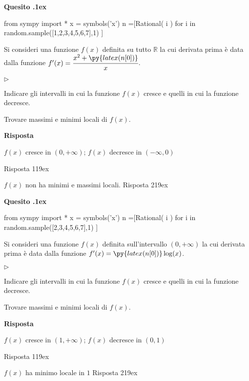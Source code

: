 \documentclass[11pt,twoside,a4paper]{article}
\newcommand{\mylabel}[1]{#1\hfill}
\renewenvironment{itemize}
  {\begin{list}{$\triangleright$}{%
   \setlength{\parskip}{0mm}
   \setlength{\topsep}{.4\baselineskip}
   \setlength{\rightmargin}{0mm}
   \setlength{\listparindent}{0mm}
   \setlength{\itemindent}{0mm}
   \setlength{\labelwidth}{2ex}
   \setlength{\itemsep}{.4\baselineskip}
   \setlength{\parsep}{0mm}
   \setlength{\partopsep}{0mm}
   \setlength{\labelsep}{1ex}
   \setlength{\leftmargin}{\labelwidth+\labelsep}
   \let\makelabel\mylabel}}{%
   \end{list}\vspace*{-1.3mm}}
\newcounter{quesito}
\newenvironment{question}{\bigskip\addtocounter{quesito}{1}\bigskip\bigskip\par\textbf{Quesito \thequesito.\kern1ex}}{\vspace{\parskip}}
\newenvironment{answer}{\par\textbf{Risposta\quad}}{\vspace{\parskip}}
\begin{document}
\begin{question}
\def\RR{{\mathds R}}
\begin{pycode}
from sympy import *
x = symbols('x')
n =[Rational( i ) for i in random.sample([1,2,3,4,5,6,7],1) ]
\end{pycode}
Si consideri una funzione $f(x)$ definita su tutto $\RR$ la cui derivata prima è data dalla funzione $f'(x) = \cfrac{x^2 + \py{latex(n[0])}}{x}$.
\begin{itemize}
\item[1.] Indicare gli intervalli in cui la funzione $f(x)$ cresce e quelli in cui la funzione decresce.
\item[2.] Trovare massimi e minimi locali di $f(x)$.
\end{itemize}
\begin{answer}

{\color{blue}
$f(x)$ cresce in $(0, +\infty)$; $f(x)$ decresce in $(-\infty, 0)$ }

{\color{blue}
\hfill Risposta 1\kern19ex}

{\color{blue}
$f(x)$ non ha minimi e massimi locali.
\hfill Risposta 2\kern19ex}

\end{answer}
\end{question}
\begin{question}
\def\RR{{\mathds R}}
\begin{pycode}
from sympy import *
x = symbols('x')
n =[Rational( i ) for i in random.sample([2,3,4,5,6,7],1) ]
\end{pycode}
Si consideri una funzione $f(x)$ definita sull'intervallo $(0, +\infty)$ la cui derivata prima è data dalla funzione $f'(x) = \py{latex(n[0])}\log (x)$.
\begin{itemize}
\item[1.] Indicare gli intervalli in cui la funzione $f(x)$ cresce e quelli in cui la funzione decresce.
\item[2.] Trovare massimi e minimi locali di $f(x)$.
\end{itemize}
\begin{answer}

{\color{blue}
$f(x)$ cresce in $(1, +\infty)$; $f(x)$ decresce in $(0, 1)$ }

{\color{blue}
\hfill Risposta 1\kern19ex}

{\color{blue}
$f(x)$ ha minimo locale in $1$
\hfill Risposta 2\kern19ex}

\end{answer}
\end{question}
\end{document}
